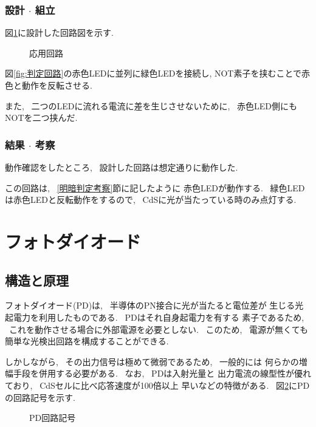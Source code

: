 \documentclass[titlepage]{jsarticle}
\begin{document}
        \subsubsection{設計 $\cdot$ 組立}
            図\ref{fig:応用回路}に設計した回路図を示す.
            
            \begin{figure}[ht]
                \centering
                \caption{応用回路}
                \label{fig:応用回路}
            \end{figure}

            図\ref{fig:判定回路}の赤色LEDに並列に緑色LEDを接続し,
            NOT素子を挟むことで赤色と動作を反転させる.

            また, ~二つのLEDに流れる電流に差を生じさせないために,
            ~赤色LED側にもNOTを二つ挟んだ.
        
        \subsubsection{結果 $\cdot$ 考察}
            動作確認をしたところ, ~設計した回路は想定通りに動作した.
            
            この回路は, ~\ref{明暗判定考察}節に記したように
            赤色LEDが動作する. ~緑色LEDは赤色LEDと反転動作をするので,
            ~CdSに光が当たっている時のみ点灯する.

\section{フォトダイオード}
    \subsection{構造と原理}
        フォトダイオード(PD)は, ~半導体のPN接合に光が当たると電位差が
        生じる光起電力を利用したものである. ~PDはそれ自身起電力を有する
        素子であるため, ~これを動作させる場合に外部電源を必要としない.
        ~このため, ~電源が無くても簡単な光検出回路を構成することができる.
        
        しかしながら, ~その出力信号は極めて微弱であるため, ~一般的には
        何らかの増幅手段を併用する必要がある. ~なお, ~PDは入射光量と
        出力電流の線型性が優れており, ~CdSセルに比べ応答速度が100倍以上
        早いなどの特徴がある. ~図\ref{fig:PD}にPDの回路記号を示す.

        \begin{figure}[ht]
            \centering
            \caption{PD回路記号}
            \label{fig:PD}
        \end{figure}
\end{document}
